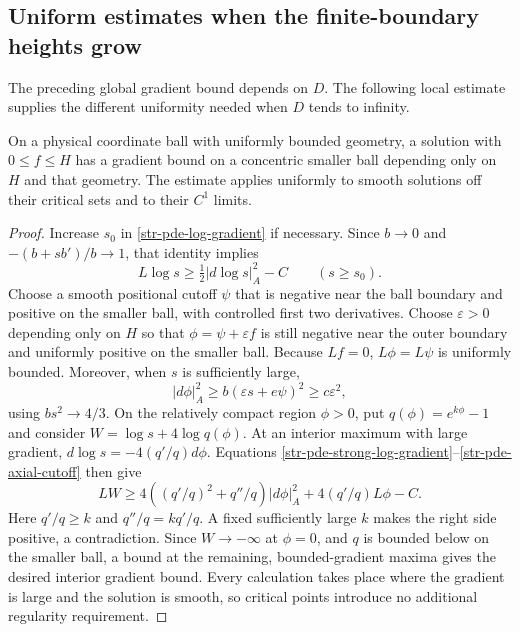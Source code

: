\subsection{Uniform estimates when the finite-boundary heights grow}

The preceding global gradient bound depends on $D$. The following
local estimate supplies the different uniformity needed when
$D$ tends to infinity.

\begin{lemma}
\label{str-pde-local-gradient}
On a physical coordinate ball with uniformly bounded geometry,
a solution with $0\leq f\leq H$ has a gradient bound on a
concentric smaller ball depending only on $H$ and that geometry.
The estimate applies uniformly to smooth solutions off their
critical sets and to their $C^1$ limits.
\end{lemma}
\begin{proof}
Increase $s_0$ in \eqref{str-pde-log-gradient} if necessary.
Since $b\to0$ and $-(b+s b')/b\to1$, that identity implies
\begin{equation}\label{str-pde-strong-log-gradient}
 L\log s\geq\tfrac12|d\log s|_A^2-C
 \qquad(s\geq s_0).
\end{equation}
Choose a smooth positional cutoff $\psi$ that is negative near
the ball boundary and positive on the smaller ball, with
controlled first two derivatives. Choose $\varepsilon>0$
depending only on $H$ so that
$\phi=\psi+\varepsilon f$ is still negative near the outer
boundary and uniformly positive on the smaller ball.
Because $Lf=0$, $L\phi=L\psi$ is uniformly bounded. Moreover,
when $s$ is sufficiently large,
\begin{equation}\label{str-pde-axial-cutoff}
 |d\phi|_A^2\geq b(\varepsilon s+e\psi)^2
 \geq c\varepsilon^2,
\end{equation}
using $bs^2\to4/3$.
On the relatively compact region $\phi>0$, put
$q(\phi)=e^{k\phi}-1$ and consider
$W=\log s+4\log q(\phi)$.
At an interior maximum with large gradient,
$d\log s=-4(q'/q)d\phi$. Equations
\eqref{str-pde-strong-log-gradient}--\eqref{str-pde-axial-cutoff}
then give
\begin{equation}\label{str-pde-local-maximum}
 LW\geq
 4\left((q'/q)^2+q''/q\right)|d\phi|_A^2
 +4(q'/q)L\phi-C.
\end{equation}
Here $q'/q\geq k$ and $q''/q=kq'/q$. A fixed sufficiently
large $k$ makes the right side positive, a contradiction.
Since $W\to-\infty$ at $\phi=0$, and $q$ is bounded below
on the smaller ball, a bound at the remaining, bounded-gradient
maxima gives the desired interior gradient bound. Every
calculation takes place where the gradient is large and the
solution is smooth, so critical points introduce no additional
regularity requirement.
\end{proof}

